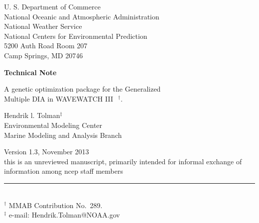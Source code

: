 \documentclass[12pt]{article}
\newcommand{\wwt}{WAVEWATCH III$\:$\textsuperscript\textregistered}
\begin{document}

\pagestyle{empty}

\strut \vspace{5mm}

\begin{center} 
U. S. Department of Commerce \\
National Oceanic and Atmospheric Administration \\
National Weather Service \\
National Centers for Environmental Prediction \\
5200 Auth Road Room 207 \\
Camp Springs, MD 20746

\vspace{15mm}

{\bf Technical Note}

\vspace{15mm}

{\large A genetic optimization package for the Generalized \\ Multiple DIA in
  \wwt\ $^\dag$.}

\vspace{20mm}

Hendrik l. Tolman$^\ddag$
\\
Environmental Modeling Center \\
Marine Modeling and Analysis Branch

\vspace{20mm}

Version 1.3, November 2013 \\

\vfill {\sc this is an unreviewed manuscript, primarily
intended for informal exchange of information among ncep staff
members}

\end{center}
\noindent \rule{140mm}{0.5mm} \\
{\small $^\dag$ MMAB Contribution No.~289. \\
$^\ddag$ e-mail: Hendrik.Tolman@NOAA.gov} \\
\end{document}
